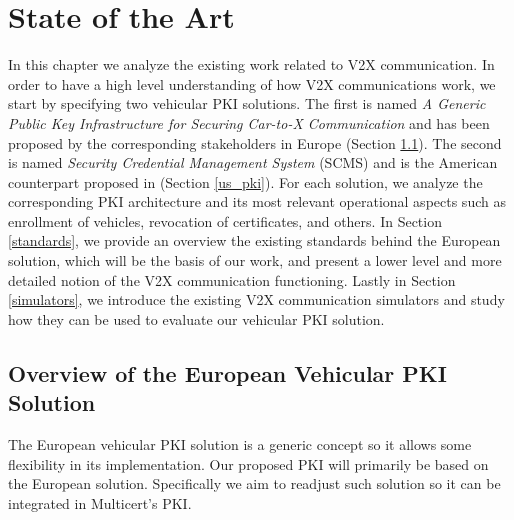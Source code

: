 
\chapter{State of the Art}
\label{related_work}

In this chapter we analyze the existing work related to V2X communication. In order to have a high level understanding of how V2X communications work, we
start by specifying two vehicular PKI solutions. The first is named \textit{A Generic Public Key Infrastructure for Securing Car-to-X Communication} and has been proposed by the corresponding stakeholders in Europe \cite{generic_eu} \cite{etsi_formats} \cite{wow} (Section \ref{etsi_design}). The second is named \textit{Security Credential Management System} (SCMS) and is the American counterpart proposed in \cite{scms} (Section \ref{us_pki}). For each solution, we analyze the corresponding PKI architecture and its most relevant operational aspects such as enrollment of vehicles, revocation of certificates, and others. In Section \ref{standards}, we provide an overview the existing standards behind the European solution, which will be the basis of our work, and present a lower level and more detailed notion of the V2X communication functioning. Lastly in Section \ref{simulators}, we introduce the existing V2X communication simulators and study how they can be used to evaluate our vehicular PKI solution. 


\section{Overview of the European Vehicular PKI Solution}
\label{etsi_design}
The European vehicular PKI solution is a generic concept so it allows some flexibility in its implementation. Our proposed PKI will primarily be based on the European solution. Specifically we aim to readjust such solution so it can be integrated in Multicert's PKI. 


